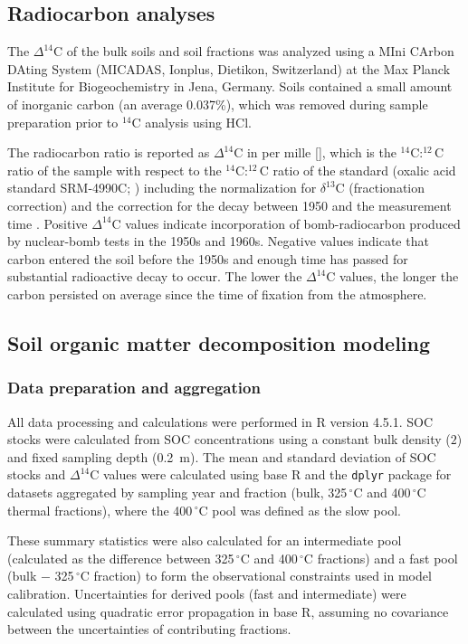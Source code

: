 \documentclass[bg, manuscript]{copernicus}
\begin{document}
\subsection{Radiocarbon analyses}
The $\Delta^{14}\text{C}$ of the bulk soils and soil fractions was analyzed using a MIni CArbon DAting System (MICADAS, Ionplus, Dietikon, Switzerland) at the Max Planck Institute for Biogeochemistry in Jena, Germany. Soils contained a small amount of inorganic carbon (an average 0.037\%), which was removed during sample preparation prior to $^{14}\text{C}$ analysis using HCl.

The radiocarbon ratio is reported as $\Delta^{14}\text{C}$ in per mille [\permil], which is the $^{14}\text{C}:^{12}\text{C}$ ratio of the sample with respect to the $^{14}\text{C}:^{12}\text{C}$ ratio of the standard (oxalic acid standard SRM-4990C; \citet{Steinhof2017}) including the normalization for $\delta^{13}\text{C}$ (fractionation correction) and the correction for the decay between 1950 and the measurement time \citep{Stuiver1977}. Positive $\Delta^{14}\text{C}$ values indicate incorporation of bomb-radiocarbon produced by nuclear-bomb tests in the 1950s and 1960s. Negative values indicate that carbon entered the soil before the 1950s and enough time has passed for substantial radioactive decay to occur. The lower the $\Delta^{14}\text{C}$ values, the longer the carbon persisted on average since the time of fixation from the atmosphere.

\subsection{Soil organic matter decomposition modeling}

\subsubsection{Data preparation and aggregation}
All data processing and calculations were performed in R version 4.5.1. SOC stocks were calculated from SOC concentrations using a constant bulk density ($2$) and fixed sampling depth (0.2~m). The mean and standard deviation of SOC stocks and $\Delta^{14}\text{C}$ values were calculated using base R and the \texttt{dplyr} package for datasets aggregated by sampling year and fraction (bulk, 325\,$^\circ\text{C}$ and 400\,$^\circ\text{C}$ thermal fractions), where the 400\,$^\circ\text{C}$ pool was defined as the slow pool.

These summary statistics were also calculated for an intermediate pool (calculated as the difference between 325\,$^\circ\text{C}$ and 400\,$^\circ\text{C}$ fractions) and a fast pool (bulk $-$ 325\,$^\circ\text{C}$ fraction) to form the observational constraints used in model calibration. Uncertainties for derived pools (fast and intermediate) were calculated using quadratic error propagation in base R, assuming no covariance between the uncertainties of contributing fractions.
\end{document}
